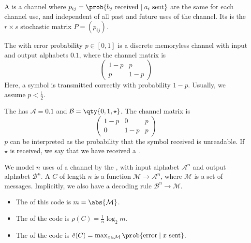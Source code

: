 \begin{definition}
    A  is a channel where $p_{ij} = \prob{b_j \text{ received} \mid a_i \text{ sent}}$ are the same for each channel use, and independent of all past and future uses of the channel.
    Its  is the $r \times s$ stochastic matrix $P = (p_{ij})$.
\end{definition}

\begin{example}
    The  with error probability $p \in [0,1]$ is a discrete memoryless channel with input and output alphabets $\qty{0, 1}$, where the channel matrix is
    \[ \begin{pmatrix}
            1-p & p \\
            p & 1-p
    \end{pmatrix} \]
    Here, a symbol is transmitted correctly with probability $1 - p$.
    Usually, we assume $p < \frac{1}{2}$.
\end{example}

\begin{example}
    The  has $\mathcal A = \qty{0, 1}$ and $\mathcal B = \qty{0, 1, \star}$.
    The channel matrix is
    \[ \begin{pmatrix}
        1-p & 0 & p \\
        0 & 1-p & p
    \end{pmatrix} \]
    $p$ can be interpreted as the probability that the symbol received is unreadable.
    If $\star$ is received, we say that we have received a .
\end{example}

\begin{definition}
    We model $n$ uses of a channel by the , with input alphabet $\mathcal A^n$ and output alphabet $\mathcal B^n$.
    A  $C$ of length $n$ is a function $\mathcal M \to \mathcal A^n$, where $\mathcal M$ is a set of messages.
    Implicitly, we also have a decoding rule $\mathcal B^n \to \mathcal M$.
    \begin{itemize}
        \item The  of this code is $m = \abs{\mathcal M}$.
        \item The  of the code is $\rho(C) = \frac{1}{n} \log_2 m$.
        \item The  of the code is $\hat e(C) = \max_{x \in \mathcal M} \prob{\text{error} \mid x \text{ sent}}$.
    \end{itemize}
\end{definition}

